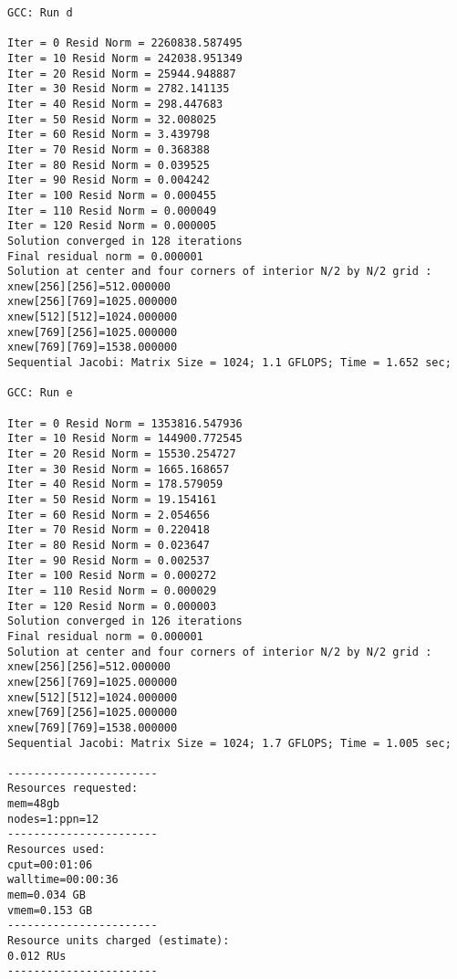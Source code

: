 \documentclass[11pt]{article}
\begin{document}
\begin{lstlisting}
GCC: Run d
 
Iter = 0 Resid Norm = 2260838.587495
Iter = 10 Resid Norm = 242038.951349
Iter = 20 Resid Norm = 25944.948887
Iter = 30 Resid Norm = 2782.141135
Iter = 40 Resid Norm = 298.447683
Iter = 50 Resid Norm = 32.008025
Iter = 60 Resid Norm = 3.439798
Iter = 70 Resid Norm = 0.368388
Iter = 80 Resid Norm = 0.039525
Iter = 90 Resid Norm = 0.004242
Iter = 100 Resid Norm = 0.000455
Iter = 110 Resid Norm = 0.000049
Iter = 120 Resid Norm = 0.000005
Solution converged in 128 iterations
Final residual norm = 0.000001
Solution at center and four corners of interior N/2 by N/2 grid : 
xnew[256][256]=512.000000
xnew[256][769]=1025.000000
xnew[512][512]=1024.000000
xnew[769][256]=1025.000000
xnew[769][769]=1538.000000
Sequential Jacobi: Matrix Size = 1024; 1.1 GFLOPS; Time = 1.652 sec; 
 
GCC: Run e
 
Iter = 0 Resid Norm = 1353816.547936
Iter = 10 Resid Norm = 144900.772545
Iter = 20 Resid Norm = 15530.254727
Iter = 30 Resid Norm = 1665.168657
Iter = 40 Resid Norm = 178.579059
Iter = 50 Resid Norm = 19.154161
Iter = 60 Resid Norm = 2.054656
Iter = 70 Resid Norm = 0.220418
Iter = 80 Resid Norm = 0.023647
Iter = 90 Resid Norm = 0.002537
Iter = 100 Resid Norm = 0.000272
Iter = 110 Resid Norm = 0.000029
Iter = 120 Resid Norm = 0.000003
Solution converged in 126 iterations
Final residual norm = 0.000001
Solution at center and four corners of interior N/2 by N/2 grid : 
xnew[256][256]=512.000000
xnew[256][769]=1025.000000
xnew[512][512]=1024.000000
xnew[769][256]=1025.000000
xnew[769][769]=1538.000000
Sequential Jacobi: Matrix Size = 1024; 1.7 GFLOPS; Time = 1.005 sec; 

-----------------------
Resources requested:
mem=48gb
nodes=1:ppn=12
-----------------------
Resources used:
cput=00:01:06
walltime=00:00:36
mem=0.034 GB
vmem=0.153 GB
-----------------------
Resource units charged (estimate):
0.012 RUs
-----------------------
\end{lstlisting}
\end{document}
